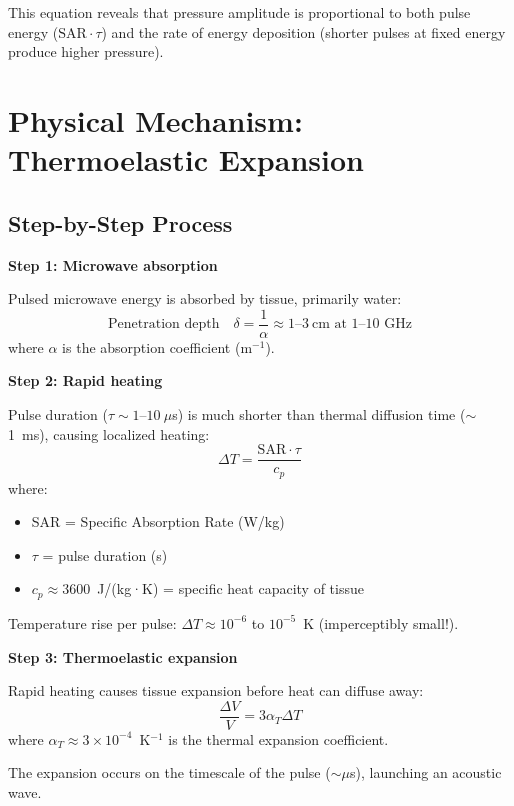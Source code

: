 This equation reveals that pressure amplitude is proportional to both pulse energy ($\text{SAR} \cdot \tau$) and the rate of energy deposition (shorter pulses at fixed energy produce higher pressure).

\section{Physical Mechanism: Thermoelastic Expansion}

\subsection{Step-by-Step Process}

\textbf{Step 1: Microwave absorption}

Pulsed microwave energy is absorbed by tissue, primarily water:
\begin{equation}
\text{Penetration depth} \quad \delta = \frac{1}{\alpha} \approx 1\text{--}3~\text{cm at 1--10~GHz}
\end{equation}
where $\alpha$ is the absorption coefficient (m$^{-1}$).

\textbf{Step 2: Rapid heating}

Pulse duration ($\tau \sim 1\text{--}10~\mu$s) is much shorter than thermal diffusion time ($\sim$1~ms), causing localized heating:
\begin{equation}
\Delta T = \frac{\text{SAR} \cdot \tau}{c_p}
\end{equation}
where:
\begin{itemize}
\item SAR = Specific Absorption Rate (W/kg)
\item $\tau$ = pulse duration (s)
\item $c_p \approx 3600$~J/(kg·K) = specific heat capacity of tissue
\end{itemize}

Temperature rise per pulse: $\Delta T \approx 10^{-6}$ to $10^{-5}$~K (imperceptibly small!).

\textbf{Step 3: Thermoelastic expansion}

Rapid heating causes tissue expansion before heat can diffuse away:
\begin{equation}
\frac{\Delta V}{V} = 3\alpha_T \Delta T
\end{equation}
where $\alpha_T \approx 3 \times 10^{-4}$~K$^{-1}$ is the thermal expansion coefficient.

The expansion occurs on the timescale of the pulse ($\sim\mu$s), launching an acoustic wave.

